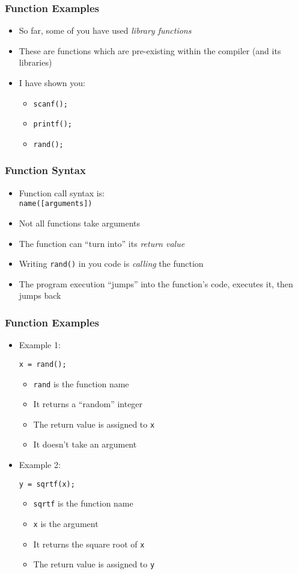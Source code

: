 \documentclass[14pt]{beamer}
\begin{document}
\begin{frame}
\frametitle{Function Examples}
\begin{itemize}
\item So far, some of you have used \textit{library functions}
\item These are functions which are pre-existing within the compiler (and its libraries)
\item I have shown you:
	\begin{itemize}
		\item \texttt{scanf();}
		\item \texttt{printf();}
		\item \texttt{rand();}
	\end{itemize}
\end{itemize}
\end{frame}

\begin{frame}[fragile]
\frametitle{Function Syntax}
\begin{itemize}
\item Function call syntax is:\\
{\small \texttt{name([arguments])} }
\item Not all functions take arguments
\item The function can ``turn into'' its \textit{return value}
\pause
\item Writing \texttt{rand()} in you code is \textit{calling} the function
\item The program execution ``jumps'' into the function's code, executes it, then jumps back
\end{itemize}
\end{frame}

\begin{frame}[fragile]
\frametitle{Function Examples}
\begin{itemize}
\item Example 1:
\begin{lstlisting}[style=CStyle]
x = rand();
\end{lstlisting}
	\begin{itemize}
		\item \texttt{rand} is the function name
		\item It returns a ``random'' integer
		\item The return value is assigned to \texttt{x}
		\item It doesn't take an argument 	
	\end{itemize}
\pause
\item Example 2:
\begin{lstlisting}[style=CStyle]
y = sqrtf(x);
\end{lstlisting}
	\begin{itemize}
		\item \texttt{sqrtf} is the function name
		\item \texttt{x} is the argument
		\item It returns the square root of \texttt{x}
		\item The return value is assigned to \texttt{y}
	\end{itemize}
\end{itemize}
\end{frame}
\end{document}
